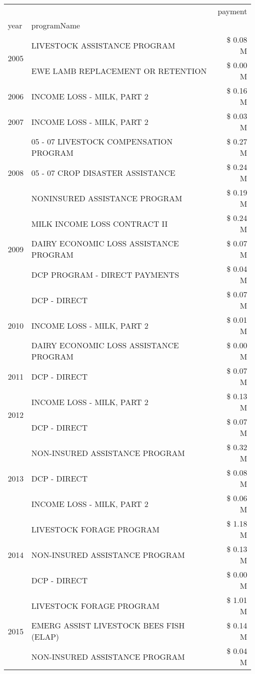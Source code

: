 \begin{tabular}{llr}
\toprule
 &  & payment \\
year & programName &  \\
\midrule
\multirow[t]{2}{*}{2005} & LIVESTOCK ASSISTANCE PROGRAM & \$ 0.08 M \\
 & EWE LAMB REPLACEMENT OR RETENTION & \$ 0.00 M \\
\cline{1-3}
2006 & INCOME LOSS - MILK, PART 2 & \$ 0.16 M \\
\cline{1-3}
2007 & INCOME LOSS - MILK, PART 2 & \$ 0.03 M \\
\cline{1-3}
\multirow[t]{3}{*}{2008} & 05 - 07 LIVESTOCK COMPENSATION PROGRAM & \$ 0.27 M \\
 & 05 - 07 CROP DISASTER ASSISTANCE & \$ 0.24 M \\
 & NONINSURED ASSISTANCE PROGRAM & \$ 0.19 M \\
\cline{1-3}
\multirow[t]{3}{*}{2009} & MILK INCOME LOSS CONTRACT II & \$ 0.24 M \\
 & DAIRY ECONOMIC LOSS ASSISTANCE PROGRAM & \$ 0.07 M \\
 & DCP PROGRAM - DIRECT PAYMENTS & \$ 0.04 M \\
\cline{1-3}
\multirow[t]{3}{*}{2010} & DCP - DIRECT & \$ 0.07 M \\
 & INCOME LOSS - MILK, PART 2 & \$ 0.01 M \\
 & DAIRY ECONOMIC LOSS ASSISTANCE PROGRAM & \$ 0.00 M \\
\cline{1-3}
2011 & DCP - DIRECT & \$ 0.07 M \\
\cline{1-3}
\multirow[t]{2}{*}{2012} & INCOME LOSS - MILK, PART 2 & \$ 0.13 M \\
 & DCP - DIRECT & \$ 0.07 M \\
\cline{1-3}
\multirow[t]{3}{*}{2013} & NON-INSURED ASSISTANCE PROGRAM & \$ 0.32 M \\
 & DCP - DIRECT & \$ 0.08 M \\
 & INCOME LOSS - MILK, PART 2 & \$ 0.06 M \\
\cline{1-3}
\multirow[t]{3}{*}{2014} & LIVESTOCK FORAGE PROGRAM & \$ 1.18 M \\
 & NON-INSURED ASSISTANCE PROGRAM & \$ 0.13 M \\
 & DCP - DIRECT & \$ 0.00 M \\
\cline{1-3}
\multirow[t]{3}{*}{2015} & LIVESTOCK FORAGE PROGRAM & \$ 1.01 M \\
 & EMERG ASSIST LIVESTOCK BEES FISH (ELAP) & \$ 0.14 M \\
 & NON-INSURED ASSISTANCE PROGRAM & \$ 0.04 M \\

\end{tabular}
